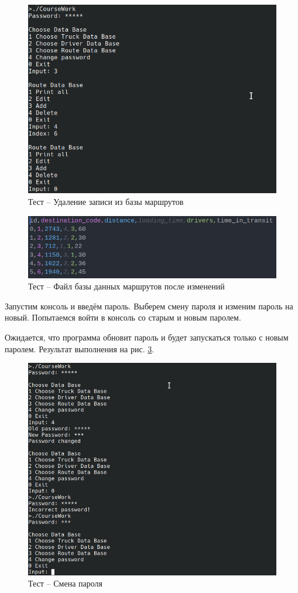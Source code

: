 \begin{figure}[H]
	\centering
	\includegraphics[width=0.8\linewidth]{photo/tests/admin/route_db_delete}
	\caption{Тест -- Удаление записи из базы маршрутов}
	\label{route_db_delete}
\end{figure}

\begin{figure}[H]
	\centering
	\includegraphics[width=0.7\linewidth]{photo/tests/admin/route_db_state_init}
	\caption{Тест -- Файл базы данных маршрутов после изменений}
	\label{route_db_state_init3}
\end{figure}

Запустим консоль и введём пароль. 
Выберем смену пароля и изменим пароль на новый.
Попытаемся войти в консоль со старым и новым паролем.

Ожидается, что программа обновит пароль и 
будет запускаться только с новым паролем.
Результат выполнения на рис. \ref{change_pass}.

\begin{figure}[H]
	\centering
	\includegraphics[width=0.7\linewidth]{photo/tests/admin/change_pass}
	\caption{Тест -- Смена пароля}
	\label{change_pass}
\end{figure}

